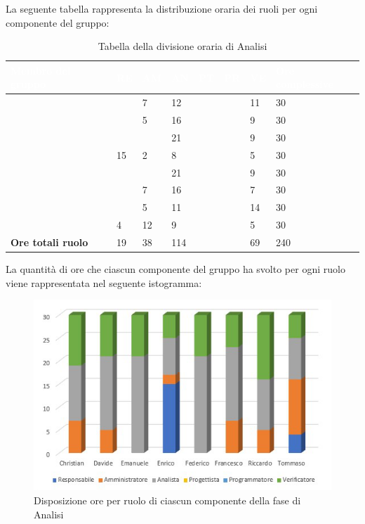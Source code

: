 La seguente tabella rappresenta la distribuzione oraria dei ruoli per ogni componente del gruppo:
{
\renewcommand{\arraystretch}{2}

\centering

\begin{longtable}[h!] { C{4cm} C{1cm} C{1cm} C{1cm} C{1cm} C{1cm} C{1cm} C{3cm}}
\caption{Tabella della divisione oraria di Analisi}	\\
	\textcolor{white}{\textbf{Membro del gruppo}} & 
	\textcolor{white}{\textbf{RE}} & 
	\textcolor{white}{\textbf{AM}} & 
	\textcolor{white}{\textbf{AN}} & 
	\textcolor{white}{\textbf{PT}} & 
	\textcolor{white}{\textbf{PR}} & 
	\textcolor{white}{\textbf{VE}} & 
	\textcolor{white}{\textbf{Ore complessive}}\\	
\endhead        

        \MC{}     &  & 7 & 12 &  & & 11 & 30 \\
		\LD{}       &  & 5 & 16 &  &  & 9 & 30 \\
        \CE{}     &  &  & 21 &  &  & 9 & 30 \\
        \SE{}       & 15 & 2 & 8  &  &  & 5 & 30 \\
        \PF{}       &  &  & 21 &  &  & 9 & 30 \\
        \DF{}      &  & 7 & 16 &  &  & 7 & 30 \\
        \BR{}     &  & 5 & 11 &  &  & 14 & 30 \\
       \AT{}      & 4 & 12 & 9  &  &  & 5 & 30 \\
        \textbf{Ore totali ruolo} & 19 & 38 & 114 &  &  & 69 & 240 \\
        
\end{longtable}
}

La quantità di ore che ciascun componente del gruppo ha svolto per ogni ruolo viene rappresentata nel seguente istogramma:
\begin{figure}[h]
	\centering	
	\includegraphics[scale=2.30]{Sezioni/Istogrammi/IstogrammaAnalisi.png}
	\caption{Disposizione ore per ruolo di ciascun componente della fase di Analisi}
\end{figure}

